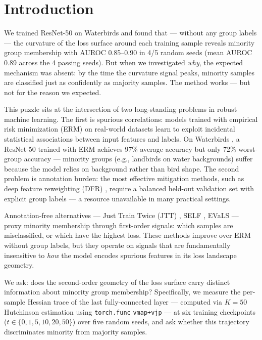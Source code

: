 \section{Introduction}

We trained ResNet-50 on Waterbirds and found that --- without any group labels --- the curvature of the loss surface around each training sample reveals minority group membership with AUROC 0.85--0.90 in 4/5 random seeds (mean AUROC 0.89 across the 4 passing seeds). But when we investigated \emph{why}, the expected mechanism was absent: by the time the curvature signal peaks, minority samples are classified just as confidently as majority samples. The method works --- but not for the reason we expected.

This puzzle sits at the intersection of two long-standing problems in robust machine learning. The first is spurious correlations: models trained with empirical risk minimization (ERM) on real-world datasets learn to exploit incidental statistical associations between input features and labels. On Waterbirds \cite{sagawa2019distributionally}, a ResNet-50 trained with ERM achieves 97\% average accuracy but only 72\% worst-group accuracy --- minority groups (e.g., landbirds on water backgrounds) suffer because the model relies on background rather than bird shape. The second problem is annotation burden: the most effective mitigation methods, such as deep feature reweighting (DFR) \cite{kirichenko2022last}, require a balanced held-out validation set with explicit group labels --- a resource unavailable in many practical settings.

Annotation-free alternatives --- Just Train Twice (JTT) \cite{liu2021just}, SELF \cite{labonte2023towards}, EVaLS --- proxy minority membership through first-order signals: which samples are misclassified, or which have the highest loss. These methods improve over ERM without group labels, but they operate on signals that are fundamentally insensitive to \emph{how} the model encodes spurious features in its loss landscape geometry.

We ask: does the second-order geometry of the loss surface carry distinct information about minority group membership? Specifically, we measure the per-sample Hessian trace of the last fully-connected layer --- computed via $K{=}50$ Hutchinson estimation using \texttt{torch.func} \texttt{vmap+vjp} --- at six training checkpoints ($t\in\{0,1,5,10,20,50\}$) over five random seeds, and ask whether this trajectory discriminates minority from majority samples.

